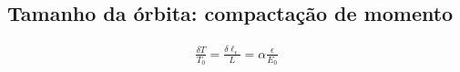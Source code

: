\subsection{Tamanho da órbita: compactação de momento}\label{sec:3.2}
\begin{align}
	\frac{\delta T}{T_0} = \frac{\delta \ell_\epsilon}{L} = \alpha \frac{\epsilon}{E_0}\label{eq:3.15}
\end{align}